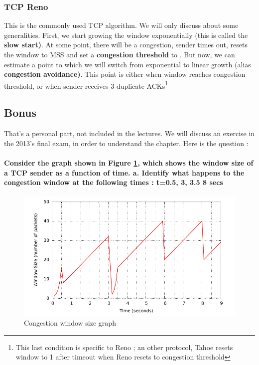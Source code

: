 \documentclass[12pt,a4paper]{article}
\begin{document}
\subsubsection{TCP Reno}
This is the commonly used TCP algorithm. We will only discuss about some generalities. First, we start growing the window exponentially (this is called the \textbf{slow start)}. At some point, there will be a congestion, sender times out, resets the window to MSS and set a \textbf{congestion threshold} to  . But now, we can estimate a point to which we will switch from exponential to linear growth (alias \textbf{congestion avoidance)}. This point is either when window reaches congestion threshold, or when sender receives 3 duplicate ACKs\footnote{This last condition is specific to Reno ; an other protocol, Tahoe resets window to 1 after timeout when Reno resets to congestion threshold}

\subsection{Bonus}
That's a personal part, not included in the lectures. We will discuss an exercise in the 2013's final exam, in order to understand the chapter.
Here is the question : 
\paragraph{Consider the graph shown in Figure \ref{fig: 2013}, which shows the window size of a TCP sender as a function of time. a. Identify what happens to the congestion window at the following times : t=0.5, 3, 3.5 8 secs}
\begin{figure}[h]
	\centering
	\includegraphics[scale=0.5]{images/2013}
	\caption{Congestion window size graph}
	\label{fig: 2013}
\end{figure}
\end{document}
